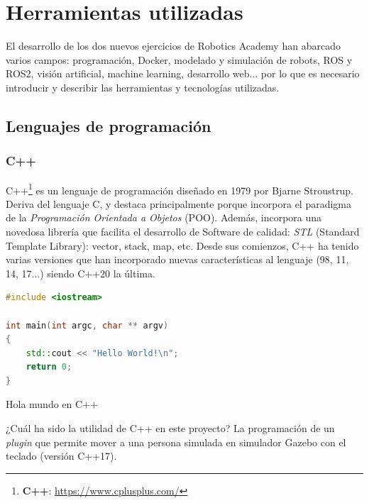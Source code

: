 \chapter{Herramientas utilizadas}
\label{cap:capitulo3}

El desarrollo de los dos nuevos ejercicios de Robotics Academy han abarcado varios campos: programación, Docker, modelado y simulación de robots, ROS y ROS2, visión artificial, machine learning, desarrollo web... por lo que es necesario introducir y describir las herramientas y tecnologías utilizadas.\\



\section{Lenguajes de programación}
\label{sec:lenguajes_programacion}


\subsection{C++}
\label{subsec:c++}

C++\footnote{\textbf{C++}: \url{https://www.cplusplus.com/}} es un lenguaje de programación diseñado en 1979 por Bjarne Stroustrup. Deriva del lenguaje C, y destaca principalmente porque incorpora el paradigma de la \textit{Programación Orientada a Objetos} (POO). Además, incorpora una novedosa librería que facilita el desarrollo de Software de calidad: \textit{STL} (Standard Template Library): vector, stack, map, etc. Desde sus comienzos, C++ ha tenido varias versiones que han incorporado nuevas características al lenguaje (98, 11, 14, 17...) siendo C++20 la última.\\

\begin{code}[H]
\begin{lstlisting}[language=C++]
#include <iostream>

int main(int argc, char ** argv)
{
	std::cout << "Hello World!\n";
	return 0;
}
\end{lstlisting}
\caption[Hola mundo en C++]{Hola mundo en C++}
\label{cod:holamundo_cplusplus}
\end{code}

¿Cuál ha sido la utilidad de C++ en este proyecto? La programación de un \textit{plugin} que permite mover a una persona simulada en simulador Gazebo con el teclado (versión C++17).\\




